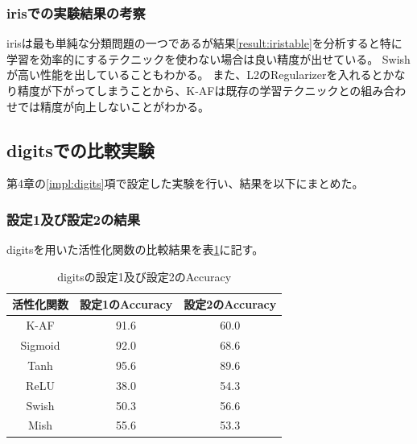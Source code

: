 \subsubsection{irisでの実験結果の考察}


irisは最も単純な分類問題の一つであるが結果\ref{result:iristable}を分析すると特に学習を効率的にするテクニックを使わない場合は良い精度が出せている。
Swishが高い性能を出していることもわかる。
また、L2のRegularizerを入れるとかなり精度が下がってしまうことから、K-AFは既存の学習テクニックとの組み合わせでは精度が向上しないことがわかる。






\subsection{digitsでの比較実験}
\label{ev:digitsでの比較実験}
第4章の\ref{impl:digits}項で設定した実験を行い、結果を以下にまとめた。
\subsubsection{設定1及び設定2の結果}
\label{digits:result}

digitsを用いた活性化関数の比較結果を表\ref{result:digitstable}に記す。

\begin{table}[htbp]
    \begin{center}
        \caption{digitsの設定1及び設定2のAccuracy}
        \label{result:digitstable}
        \vspace{2mm} 
        \begin{tabular}{|c|c|c|}
            \hline
            活性化関数              & 設定1のAccuracy &  設定2のAccuracy \\
            \hline
            K-AF            & 91.6 & 60.0 \\
            \hline
            Sigmoid            & 92.0 & 68.6\\
            \hline
            Tanh            & 95.6 & 89.6 \\
            \hline
            ReLU        & 38.0 & 54.3 \\
            \hline
            Swish           & 50.3 & 56.6 \\
            \hline
            Mish           & 55.6 & 53.3 \\
            \hline
    
        \end{tabular}
    \end{center}
\end{table}


